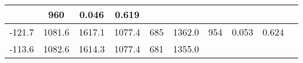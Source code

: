 \documentclass[a4paper,10pt]{article}
\begin{document}
\begin{longtable}{
     |
%    
    c|
%    
    c|
%    
    c|
%    
    c|
%    
    c|
%    
    c|
%    
    c|
%    
    c|
%    
    c|
%    
    c|
%    
    }
%        
        & 960
%        

%        

%        
        & 0.046
%        

%        

%        
        & 0.619
%        

%        
        \\
        \hline

        

%        

%        
        -121.7
%        

%        

%        
        & 1081.6
%        

%        

%        
        & 1617.1
%        

%        

%        
        & 1077.4
%        

%        

%        
        & 685
%        

%        

%        
        & 1362.0
%        

%        

%        
        & 954
%        

%        

%        
        & 0.053
%        

%        

%        
        & 0.624
%        

%        
        \\
        \hline

        

%        

%        
        -113.6
%        

%        

%        
        & 1082.6
%        

%        

%        
        & 1614.3
%        

%        

%        
        & 1077.4
%        

%        

%        
        & 681
%        

%        

%        
        & 1355.0
%        

%        


\end{longtable}
\end{document}
